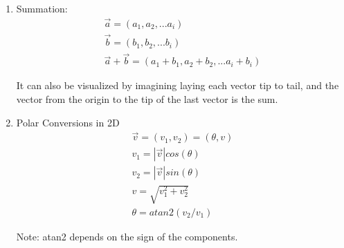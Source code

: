 \documentclass{report}
\begin{document}
\begin{description}
\begin{mdframed}
\begin{enumerate}
                   \begin{center}
                   \end{center}
               \item Summation:
                   \begin{gather}
                        \vec{a} = (a_1, a_2, ... a_i)\\
                        \vec{b} = (b_1, b_2, ... b_i)\\
                        \vec{a} + \vec{b}
                        = (a_1 + b_1, a_2 + b_2, ... a_i + b_i)
                   \end{gather}
                   
                   It can also be visualized by imagining laying
                   each vector tip to tail, and the vector from the
                   origin to the tip of the last vector is the sum.

                   \begin{center}
                   \end{center}
                                       
               \item Polar Conversions in 2D
                   \begin{gather}
                       \vec{v} = (v_1, v_2) = (\theta, v)\\ 
                       v_1 = |\vec{v}|cos(\theta)\\
                       v_2 = |\vec{v}|sin(\theta)\\
                       v = \sqrt{v_1^2 + v_2^2}\\
                       \theta = atan2(v_2/v_1)
                   \end{gather}

                   Note: atan2 depends on the sign of the
                   components.
           \end{enumerate}
        \end{mdframed}


\end{description}
\end{document}

